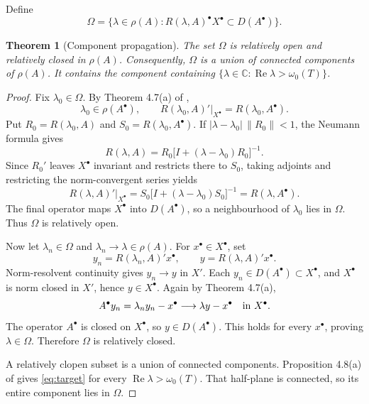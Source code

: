 \documentclass[11pt]{article}
\newtheorem{theorem}{Theorem}
\newcommand{\C}{\mathbb C}
\begin{document}
Define
\[
 \Omega=\bigl\{\lambda\in\rho(A):
 R(\lambda,A)^\bullet X^\bullet\subset D(A^\bullet)\bigr\}.
\]

\begin{theorem}[Component propagation]\label{thm:component}
The set \(\Omega\) is relatively open and relatively closed in \(\rho(A)\).
Consequently, \(\Omega\) is a union of connected components of \(\rho(A)\).
It contains the component containing
\(\{\lambda\in\C:\operatorname{Re}\lambda>\omega_0(T)\}\).
\end{theorem}

\begin{proof}
Fix \(\lambda_0\in\Omega\). By Theorem 4.7(a) of \cite{source},
\begin{equation}\label{eq:seed}
 \lambda_0\in\rho(A^\bullet),\qquad
 R(\lambda_0,A)'|_{X^\bullet}=R(\lambda_0,A^\bullet).
\end{equation}
Put \(R_0=R(\lambda_0,A)\) and
\(S_0=R(\lambda_0,A^\bullet)\). If
\(|\lambda-\lambda_0|\,\|R_0\|<1\), the Neumann formula gives
\[
 R(\lambda,A)
 =R_0\bigl[I+(\lambda-\lambda_0)R_0\bigr]^{-1}.
\]
Since \(R_0'\) leaves \(X^\bullet\) invariant and restricts there to
\(S_0\), taking adjoints and restricting the norm-convergent series yields
\[
 R(\lambda,A)'|_{X^\bullet}
 =S_0\bigl[I+(\lambda-\lambda_0)S_0\bigr]^{-1}
 =R(\lambda,A^\bullet).
\]
The final operator maps \(X^\bullet\) into \(D(A^\bullet)\), so a
neighbourhood of \(\lambda_0\) lies in \(\Omega\). Thus \(\Omega\) is
relatively open.

Now let \(\lambda_n\in\Omega\) and
\(\lambda_n\to\lambda\in\rho(A)\). For \(x^\bullet\in X^\bullet\), set
\[
 y_n=R(\lambda_n,A)'x^\bullet,
 \qquad y=R(\lambda,A)'x^\bullet.
\]
Norm-resolvent continuity gives \(y_n\to y\) in \(X'\). Each
\(y_n\in D(A^\bullet)\subset X^\bullet\), and \(X^\bullet\) is norm closed
in \(X'\), hence \(y\in X^\bullet\). Again by Theorem 4.7(a),
\[
 A^\bullet y_n=\lambda_n y_n-x^\bullet
 \longrightarrow \lambda y-x^\bullet
 \quad\hbox{in }X^\bullet.
\]
The operator \(A^\bullet\) is closed on \(X^\bullet\), so
\(y\in D(A^\bullet)\). This holds for every \(x^\bullet\), proving
\(\lambda\in\Omega\). Therefore \(\Omega\) is relatively closed.

A relatively clopen subset is a union of connected components. Proposition
4.8(a) of \cite{source} gives \eqref{eq:target} for every
\(\operatorname{Re}\lambda>\omega_0(T)\). That half-plane is connected, so
its entire component lies in \(\Omega\).
\end{proof}
\end{document}
